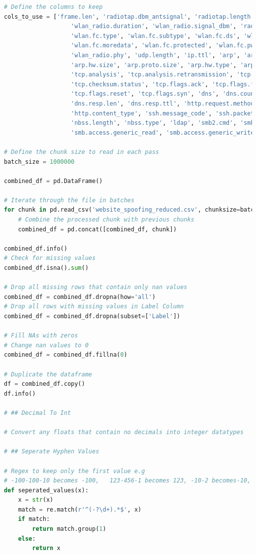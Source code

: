 \begin{appendices}
\begin{lstlisting}[language=Python]
# Define the columns to keep
cols_to_use = ['frame.len', 'radiotap.dbm_antsignal', 'radiotap.length', 'wlan.duration',
                   'wlan_radio.duration', 'wlan_radio.signal_dbm', 'radiotap.present.tsft',
                   'wlan.fc.type', 'wlan.fc.subtype', 'wlan.fc.ds', 'wlan.fc.frag',
                   'wlan.fc.moredata', 'wlan.fc.protected', 'wlan.fc.pwrmgt', 'wlan.fc.retry',
                   'wlan_radio.phy', 'udp.length', 'ip.ttl', 'arp', 'arp.proto.type',
                   'arp.hw.size', 'arp.proto.size', 'arp.hw.type', 'arp.opcode',
                   'tcp.analysis', 'tcp.analysis.retransmission', 'tcp.option_len',
                   'tcp.checksum.status', 'tcp.flags.ack', 'tcp.flags.fin', 'tcp.flags.push',
                   'tcp.flags.reset', 'tcp.flags.syn', 'dns', 'dns.count.queries', 'dns.count.answers',
                   'dns.resp.len', 'dns.resp.ttl', 'http.request.method', 'http.response.code',
                   'http.content_type', 'ssh.message_code', 'ssh.packet_length', 'nbns',
                   'nbss.length', 'nbss.type', 'ldap', 'smb2.cmd', 'smb.flags.response',
                   'smb.access.generic_read', 'smb.access.generic_write', 'smb.access.generic_execute','Label']

# Define the chunk size to read in each pass
batch_size = 1000000

combined_df = pd.DataFrame()

# Iterate through the file in batches
for chunk in pd.read_csv('website_spoofing_reduced.csv', chunksize=batch_size, usecols=cols_to_use, low_memory=False):  
    # Combine the processed chunk with previous chunks
    combined_df = pd.concat([combined_df, chunk])

combined_df.info()
# Check for missing values
combined_df.isna().sum()

# Drop all missing rows that contain only nan values
combined_df = combined_df.dropna(how='all')
# Drop all rows with missing values in Label Column
combined_df = combined_df.dropna(subset=['Label'])

# Fill NAs with zeros
# Change nan values to 0
combined_df = combined_df.fillna(0)

# Duplicate the dataframe
df = combined_df.copy()
df.info()

# ## Decimal To Int

# Convert any floats that contain no decimals into integer datatypes

# ## Seperate Hyphen Values

# Regex to keep only the first value e.g 
# -100-100-10 becomes -100,   123-456-1 becomes 123, -10-2 becomes-10, 81-63-63 becomes 81
def seperated_values(x):
    x = str(x)
    match = re.match(r'^(-?\d+).*$', x)
    if match:
        return match.group(1)
    else:
        return x


\end{lstlisting}
\end{appendices}
